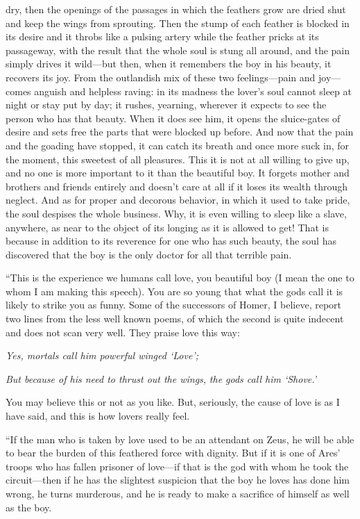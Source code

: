 dry, then the openings of the passages in which the feathers grow are
dried shut and keep the wings from sprouting. Then the stump of each
feather is blocked in its desire and it throbs like a pulsing artery
while the feather pricks at its passageway, with the result that the
whole soul is stung all around, and the pain simply drives it wild---but
then, when it remembers the boy in his beauty, it recovers its joy. From
the outlandish mix of these two feelings---pain and joy---comes anguish
and helpless raving: in its madness the lover's soul cannot 
sleep at night or stay put by day; it rushes, yearning, wherever it
expects to see the person who has that beauty. When it does see him, it
opens the sluice-gates of desire and sets free the parts that were
blocked up before. And now that the pain and the goading have stopped,
it can catch its breath and once more suck in, for the moment, this
sweetest of all pleasures. This it is not at all willing to give up, and
no one is more important to it than the beautiful boy.
It forgets mother and brothers and friends entirely and doesn't care at
all if it loses its wealth through neglect. And as for proper and
decorous behavior, in which it used to take pride, the soul despises the
whole business. Why, it is even willing to sleep like a slave, anywhere,
as near to the object of its longing as it is allowed to get! That is
because in addition to its reverence for one who has such beauty, the 
soul has discovered that the boy is the only doctor for all that
terrible pain.

“This is the experience we humans call love, you beautiful boy (I mean
the one to whom I am making this
speech). You are so
young that what the gods call it is likely to strike you as funny. Some
of the successors of Homer, I believe, report two lines from the less
well known poems, of which the second is quite indecent and does not
scan very well. They praise love this way:\crlf
\crlf

{\em Yes, mortals call him powerful winged ‘Love';}

{\em But because of his need to thrust out the wings,} {\em the gods
call him
‘Shove.'}\crlf
\crlf

You may believe this or not as you like. But, seriously, the cause of
love is as I have said, and this is how lovers really feel.

“If the man who is taken by love used to be an attendant on Zeus, he
will be able to bear the burden of this feathered force with dignity.
But if it is one of Ares' troops who has fallen prisoner of love---if
that is the god with whom he took the circuit---then if he has the
slightest suspicion that the boy he loves has done him wrong, he turns
murderous, and he is ready to make a sacrifice of himself as well as the
boy.

